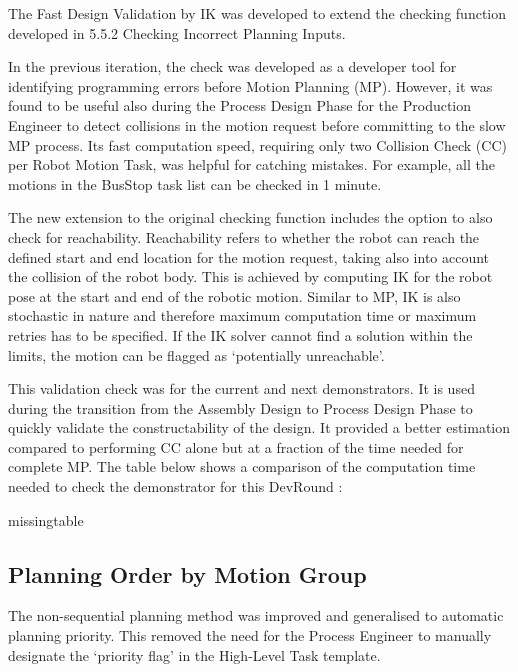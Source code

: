 The Fast Design Validation by IK was developed to extend the checking function developed in 5.5.2 Checking Incorrect Planning Inputs. 

In the previous iteration, the check was developed as a developer tool for identifying programming errors before Motion Planning (MP). However, it was found to be useful also during the Process Design Phase for the Production Engineer to detect collisions in the motion request before committing to the slow MP process. Its fast computation speed, requiring only two Collision Check (CC) per Robot Motion Task, was helpful for catching mistakes. For example, all the motions in the BusStop task list can be checked in 1 minute. 

The new extension to the original checking function includes the option to also check for reachability. Reachability refers to whether the robot can reach the defined start and end location for the motion request, taking also into account the collision of the robot body. This is achieved by computing IK for the robot pose at the start and end of the robotic motion. Similar to MP, IK is also stochastic in nature and therefore maximum computation time or maximum retries has to be specified. If the IK solver cannot find a solution within the limits, the motion can be flagged as ‘potentially unreachable’.

This validation check was for the current and next demonstrators. It is used during the transition from the Assembly Design to Process Design Phase to quickly validate the constructability of the design. It provided a better estimation compared to performing CC alone but at a fraction of the time needed for complete MP. The table below shows a comparison of the computation time needed to check the demonstrator for this DevRound :

missingtable

\subsection{Planning Order by Motion Group}
\label{subsection:exploration-4-planning-order-by-motion-group}

The non-sequential planning method  was improved and generalised to automatic planning priority. This removed the need for the Process Engineer to manually designate the ‘priority flag’ in the High-Level Task template. 

